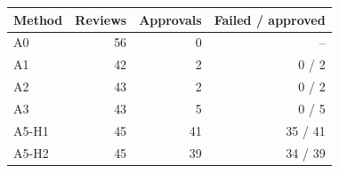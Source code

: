 \begin{tabular}{@{}lrrr@{}}
\toprule
Method & Reviews & Approvals & Failed / approved \\
\midrule
A0 & 56 & 0 & -- \\
A1 & 42 & 2 & 0 / 2 \\
A2 & 43 & 2 & 0 / 2 \\
A3 & 43 & 5 & 0 / 5 \\
A5-H1 & 45 & 41 & 35 / 41 \\
A5-H2 & 45 & 39 & 34 / 39 \\
\bottomrule
\end{tabular}
